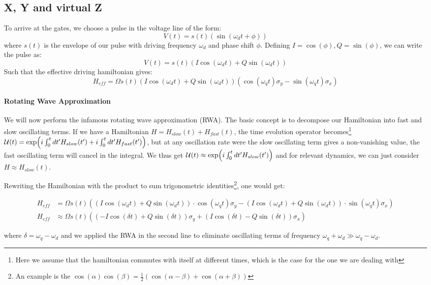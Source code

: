 \subsection{X, Y and virtual Z}
To arrive at the gates, we choose a pulse in the voltage line of the form:
\begin{equation}
    V(t) = s(t) (\sin(\omega_d t + \phi))
\end{equation}
where $s(t)$ is the envelope of our pulse with driving frequency $\omega_d$ and phase shift $\phi$. Defining $I = \cos(\phi), Q = \sin(\phi)$, we can write the pulse as:
\begin{equation}
    V(t) = s(t) \left(I \cos(\omega_d t) + Q \sin(\omega_d t)\right) 
\end{equation}
Such that the effective driving hamiltonian gives:
\begin{equation}
    H_{eff} = \Omega s(t) \left(I \cos(\omega_d t) + Q \sin(\omega_d t)\right)   \left(\cos(\omega_q t)\sigma_y - \sin(\omega_q t) \sigma_x \right)
\end{equation}


\paragraph{Rotating Wave Approximation} We will now perform the infamous rotating wave approximation (RWA). The basic concept is to decompose our Hamiltonian into fast and slow oscillating terms. If we have a Hamiltonian $H = H_{slow}(t) + H_{fast}(t)$, the time evolution operator becomes\footnote{Here we assume that the hamiltonian commutes with itself at different times, which is the case for the one we are dealing with} $\mathcal{U}(t) = \exp(i\int_0^tdt'H_{slow}(t') + i\int_0^tdt'H_{fast}(t'))$, but at any oscillation rate were the slow oscillating term gives a non-vanishing value, the fast oscillating term will cancel in the integral. We thus get $\mathcal{U}(t) \approx \exp(i\int_0^tdt'H_{slow}(t'))$ and for relevant dynamics, we can just consider $H\approx H_{slow}(t)$. 

Rewriting the Hamiltonian with the product to sum trigonometric identities\footnote{An example is the $\cos(\alpha)\cos(\beta)=\frac{1}{2}(\cos(\alpha-\beta) + \cos(\alpha + \beta))$}, one would get: 

\begin{fullwidth}
    
\begin{align}
H_{eff} &= \Omega s(t) \left((I \cos(\omega_d t) + Q \sin(\omega_d t)) \cdot \cos(\omega_q t)\sigma_y - \left(I \cos(\omega_d t) + Q \sin(\omega_d t)\right) \cdot \sin(\omega_q t) \sigma_x \right) \\
H_{eff} &\approx \Omega s(t) \left((-I \cos(\delta t) + Q \sin(\delta t))\sigma_y + \left(I \cos(\delta t) - Q \sin(\delta t)\right) \sigma_x \right)
\end{align}
\end{fullwidth}
where $\delta = \omega_q - \omega_d$ and we applied the RWA in the second line to eliminate oscillating terms of frequency $\omega_q + \omega_d \gg \omega_q - \omega_d$. 


